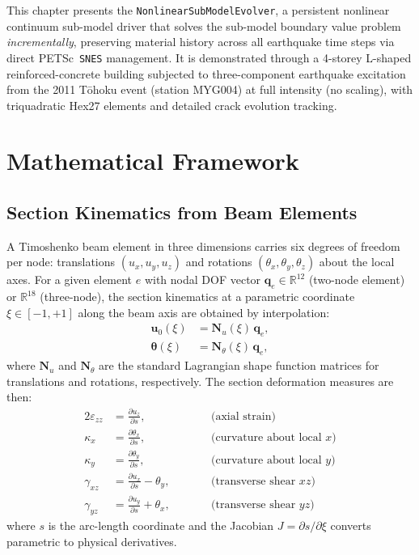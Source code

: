 This chapter presents the \texttt{NonlinearSubModelEvolver}, a
persistent nonlinear continuum sub-model driver that solves the
sub-model boundary value problem \emph{incrementally}, preserving
material history across all earthquake time steps via direct
PETSc~\texttt{SNES} management.  It is demonstrated through a 4-storey
L-shaped reinforced-concrete building subjected to three-component
earthquake excitation from the 2011 T\=ohoku event (station MYG004)
at full intensity (no scaling), with triquadratic Hex27 elements and
detailed crack evolution tracking.


\section{Mathematical Framework}
\label{sec:nlevo-math}

\subsection{Section Kinematics from Beam Elements}
\label{ssec:nlevo-section-kin}

A Timoshenko beam element in three dimensions carries six degrees of
freedom per node: translations $(u_x, u_y, u_z)$ and rotations
$(\theta_x, \theta_y, \theta_z)$ about the local axes.  For a given
element $e$ with nodal DOF vector $\mathbf{q}_e \in \mathbb{R}^{12}$
(two-node element) or $\mathbb{R}^{18}$ (three-node), the section
kinematics at a parametric coordinate $\xi \in [-1, +1]$ along the
beam axis are obtained by interpolation:
\begin{align}
  \mathbf{u}_0(\xi) &= \mathbf{N}_u(\xi)\,\mathbf{q}_e,
  \label{eq:nlevo-u0}
  \\
  \boldsymbol{\theta}(\xi) &= \mathbf{N}_\theta(\xi)\,\mathbf{q}_e,
  \label{eq:nlevo-theta}
\end{align}
where $\mathbf{N}_u$ and $\mathbf{N}_\theta$ are the standard
Lagrangian shape function matrices for translations and rotations,
respectively.  The section deformation measures are then:
\begin{alignat}{2}
  \varepsilon_{zz} &= \frac{\partial u_z}{\partial s},
  &\qquad& \text{(axial strain)}
  \label{eq:nlevo-eps-zz}
  \\
  \kappa_x &= \frac{\partial \theta_x}{\partial s},
  &\qquad& \text{(curvature about local $x$)}
  \label{eq:nlevo-kappa-x}
  \\
  \kappa_y &= \frac{\partial \theta_y}{\partial s},
  &\qquad& \text{(curvature about local $y$)}
  \label{eq:nlevo-kappa-y}
  \\
  \gamma_{xz} &= \frac{\partial u_x}{\partial s} - \theta_y,
  &\qquad& \text{(transverse shear $xz$)}
  \label{eq:nlevo-gamma-xz}
  \\
  \gamma_{yz} &= \frac{\partial u_y}{\partial s} + \theta_x,
  &\qquad& \text{(transverse shear $yz$)}
  \label{eq:nlevo-gamma-yz}
\end{alignat}
where $s$ is the arc-length coordinate and the Jacobian
$J = \partial s / \partial \xi$ converts parametric to physical
derivatives.

